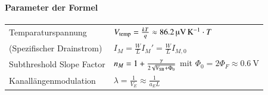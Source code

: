 



\paragraph{Parameter der Formel}

\renewcommand{\arraystretch}{1.5}
\begin{tabular}{ll}
    Temparaturspannung              & $V_{\rm temp} = \frac{k T}{q} \approx \qty{86.2}{\micro\volt\per\kelvin} \cdot T$                             \\
    (Spezifischer Drainstrom)       & $ I_M = \frac{W}{L} I_{M}' = \frac{W}{L} I_{M, 0}$                                                                                 \\
    Subthreshold Slope Factor       & $n_M = 1 + \frac{\gamma}{2\sqrt{V_{\rm SB}+\Phi_0}}$ \quad mit \quad $\Phi_0 = 2 \Phi_F \approx \qty{0.6}{\volt}$ \\
    Kanallängenmodulation           & $\lambda = \frac{1}{V_E} \approx \frac{1}{a_E L}$
\end{tabular}
\renewcommand{\arraystretch}{1}




